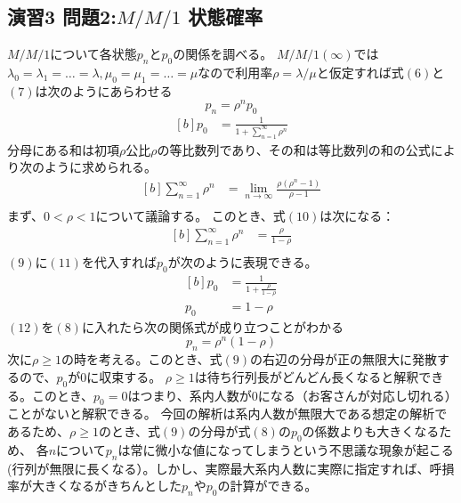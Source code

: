 \documentclass{report}
\begin{document}
\begin{CJK}{UTF8}{min}
    \newpage
    \section*{演習3 問題2:$M/M/1$ 状態確率}
    $M/M/1$について各状態$p_n$と$p_0$の関係を調べる。
    $M/M/1(\infty)$では$\lambda_0=\lambda_1=\dots=\lambda, \mu_0=\mu_1=\dots=\mu$なので利用率$\rho=\lambda/\mu$と仮定すれば式$(6)$と$(7)$は次のようにあらわせる
    \begin{equation}
        p_n=\rho^n p_0
    \end{equation}
    \begin{equation}
        \begin{aligned}[b]
            p_0 & =\frac{1}{1+\sum_{n=1}^\infty \rho^n}
        \end{aligned}
    \end{equation}
    分母にある和は初項$\rho$公比$\rho$の等比数列であり、その和は等比数列の和の公式により次のように求められる。
    \begin{equation}
        \begin{aligned}[b]
            \sum_{n=1}^\infty \rho^n & =\lim_{n\to\infty}\frac{\rho(\rho^n-1)}{\rho-1} \\
        \end{aligned}
    \end{equation}
    まず、$0<\rho<1$について議論する。
    このとき、式$(10)$は次になる：
    \begin{equation}
        \begin{aligned}[b]
            \sum_{n=1}^\infty \rho^n & =\frac{\rho}{1-\rho} \\
        \end{aligned}
    \end{equation}
    $(9)$に$(11)$を代入すれば$p_0$が次のように表現できる。
    \begin{equation}
        \begin{aligned}[b]
            p_0 & =\frac{1}{1+\frac{\rho}{1-\rho}} \\
            p_0 & =1-\rho
        \end{aligned}
    \end{equation}
    $(12)$を$(8)$に入れたら次の関係式が成り立つことがわかる
    \begin{equation}
        p_n=\rho^n (1-\rho)
    \end{equation}
    次に$\rho\geq1$の時を考える。このとき、式$(9)$の右辺の分母が正の無限大に発散するので、$p_0$が$0$に収束する。
    $\rho\geq1$は待ち行列長がどんどん長くなると解釈できる。このとき、$p_0=0$はつまり、系内人数が0になる（お客さんが対応し切れる）ことがないと解釈できる。
    今回の解析は系内人数が無限大である想定の解析であるため、$\rho\geq1$のとき、式$(9)$の分母が式$(8)$の$p_0$の係数よりも大きくなるため、
    各$n$について$p_n$は常に微小な値になってしまうという不思議な現象が起こる(行列が無限に長くなる）。しかし、実際最大系内人数に実際に指定すれば、呼損率が大きくなるがきちんとした$p_n$や$p_0$の計算ができる。


\end{CJK}
\end{document}
